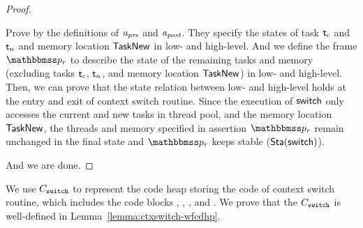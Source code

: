 {\begin{proof}
\begin{itemize}
        Prove by the definitions of $\textit{a}_\textit{pre}$ and $\textit{a}_\textit{post}$. 
        They specify the states of task $\textsf{t}_c$ and 
        $\textsf{t}_n$ and memory location $\mathsf{TaskNew}$
        in low- and high-level. And we define the frame 
        $\relastP_r$ to describe the state of the 
        remaining tasks and memory 
        (excluding tasks $\textsf{t}_c$, $\textsf{t}_n$, and 
        memory location $\mathsf{TaskNew}$) in low- and high-level.
        Then, we can prove that the 
        state relation between low- and high-level 
        holds at the entry and 
        exit of context switch routine. 
        Since the execution of $\mathsf{switch}$ only accesses 
        the current and new tasks in thread pool, and the 
        memory location $\mathsf{TaskNew}$, 
        the threads and memory specified in assertion 
        $\relastP_r$ remain unchanged 
        in the final state and $\relastP_r$ keeps 
        stable ($\textsf{Sta}(\mathsf{switch})$).
    \end{itemize}
    And we are done. 
\end{proof}

We use $C_{\texttt{switch}}$ to represent the 
code heap storing the code of context switch routine, 
which includes the code blocks \SwitchEntry{}, 
\regsave{}, \regrestore{}, 
\SaveUsedWin{} and \SwitchNewTask{}. We prove that 
the $C_{\texttt{switch}}$ is well-defined in 
Lemma~\ref{lemma:ctxswitch-wfcdhp}.

}
